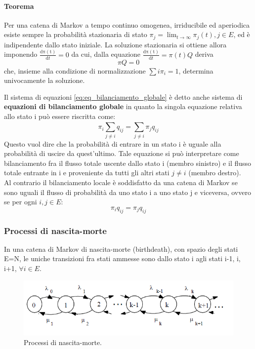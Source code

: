\paragraph{Teorema}
Per una catena di Markov a tempo continuo omogenea, irriducibile ed aperiodica esiste sempre la probabilità stazionaria di stato $\pi_j = \lim_{t \to \infty} \pi_j (t), j\in E$, ed è indipendente dallo stato iniziale.
La soluzione stazionaria si ottiene allora imponendo $\frac{\mathrm{d \pi(t)} }{\mathrm{d} t} = 0$ da cui, dalla
equazione $\frac{\mathrm{d \pi (t)} }{\mathrm{d} t} = \pi(t) Q$ deriva
\[\pi Q = 0\] \label{eq:eq_bilanciamento_globale}
che, insieme alla condizione di normalizzazione $\sum i \pi_i = 1$, determina univocamente la soluzione.


Il sistema di equazioni \ref{eq:eq_bilanciamento_globale} è detto anche sistema di \textbf{equazioni di bilanciamento globale} in quanto la singola equazione relativa allo stato i può essere riscritta come:
\[\pi_i \sum_{j\neq i}^{} q_{ij} = \sum_{j \neq i}^{} \pi_j q_{ij}\]
Questo vuol dire che la probabilità di entrare in un stato i è uguale alla probabilità di uscire da quest'ultimo.
Tale equazione si può interpretare come bilanciamento fra il flusso totale uscente dallo stato i (membro sinistro) e il flusso totale entrante in i e proveniente da tutti gli altri stati $j\neq i$ (membro destro).\\
Al contrario il bilanciamento locale è soddisfatto da una catena di Markov se sono uguali il flusso di probabilità da uno stato i a uno stato j e viceversa, ovvero se per ogni $i,j \in E$:
\[\pi_i q_{ij}= \pi_{j} q_{ij}\]

\subsubsection{Processi di nascita-morte}
In una catena di Markov di nascita-morte (birthdeath), con spazio degli stati E=N, le uniche transizioni fra stati ammesse sono dallo stato i agli stati i-1, i, i+1, $\forall i \in E$.

\begin{figure}[H]
	\centering
    \includegraphics[width=15cm, keepaspectratio]{img/process_nasc_morte.png}
	\caption{Processi di nascita-morte.}\label{fig:nascita_morte}
\end{figure}


